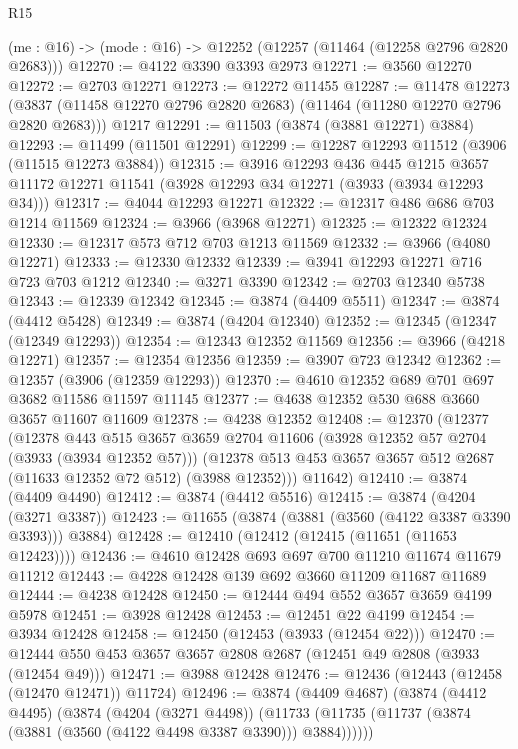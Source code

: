 \begin{lexlean}{R15}
\begin{coremodule}
  (me : @16) -> (mode : @16) -> @12252 (@12257 (@11464 (@12258 @2796 @2820 @2683)))
@12270 := @4122 @3390 @3393 @2973
@12271 := @3560 @12270
@12272 := @2703 @12271
@12273 := @12272 @11455
@12287 := @11478
    @12273
    (@3837 (@11458 @12270 @2796 @2820 @2683) (@11464 (@11280 @12270 @2796 @2820 @2683)))
    @1217
@12291 := @11503 (@3874 (@3881 @12271) @3884)
@12293 := @11499 (@11501 @12291)
@12299 := @12287 @12293 @11512 (@3906 (@11515 @12273 @3884))
@12315 := @3916
    @12293
    @436
    @445
    @1215
    @3657
    @11172
    @12271
    @11541
    (@3928 @12293 @34 @12271 (@3933 (@3934 @12293 @34)))
@12317 := @4044 @12293 @12271
@12322 := @12317 @486 @686 @703 @1214 @11569
@12324 := @3966 (@3968 @12271)
@12325 := @12322 @12324
@12330 := @12317 @573 @712 @703 @1213 @11569
@12332 := @3966 (@4080 @12271)
@12333 := @12330 @12332
@12339 := @3941 @12293 @12271 @716 @723 @703 @1212
@12340 := @3271 @3390
@12342 := @2703 @12340 @5738
@12343 := @12339 @12342
@12345 := @3874 (@4409 @5511)
@12347 := @3874 (@4412 @5428)
@12349 := @3874 (@4204 @12340)
@12352 := @12345 (@12347 (@12349 @12293))
@12354 := @12343 @12352 @11569
@12356 := @3966 (@4218 @12271)
@12357 := @12354 @12356
@12359 := @3907 @723 @12342
@12362 := @12357 (@3906 (@12359 @12293))
@12370 := @4610 @12352 @689 @701 @697 @3682 @11586 @11597 @11145
@12377 := @4638 @12352 @530 @688 @3660 @3657 @11607 @11609
@12378 := @4238 @12352
@12408 := @12370
    (@12377
      (@12378
        @443
        @515
        @3657
        @3659
        @2704
        @11606
        (@3928 @12352 @57 @2704 (@3933 (@3934 @12352 @57)))
        (@12378 @513 @453 @3657 @3657 @512 @2687 (@11633 @12352 @72 @512) (@3988 @12352)))
      @11642)
@12410 := @3874 (@4409 @4490)
@12412 := @3874 (@4412 @5516)
@12415 := @3874 (@4204 (@3271 @3387))
@12423 := @11655 (@3874 (@3881 (@3560 (@4122 @3387 @3390 @3393))) @3884)
@12428 := @12410 (@12412 (@12415 (@11651 (@11653 @12423))))
@12436 := @4610 @12428 @693 @697 @700 @11210 @11674 @11679 @11212
@12443 := @4228 @12428 @139 @692 @3660 @11209 @11687 @11689
@12444 := @4238 @12428
@12450 := @12444 @494 @552 @3657 @3659 @4199 @5978
@12451 := @3928 @12428
@12453 := @12451 @22 @4199
@12454 := @3934 @12428
@12458 := @12450 (@12453 (@3933 (@12454 @22)))
@12470 := @12444 @550 @453 @3657 @3657 @2808 @2687 (@12451 @49 @2808 (@3933 (@12454 @49)))
@12471 := @3988 @12428
@12476 := @12436 (@12443 (@12458 (@12470 @12471)) @11724)
@12496 := @3874
    (@4409 @4687)
    (@3874
      (@4412 @4495)
      (@3874
        (@4204 (@3271 @4498))
        (@11733 (@11735 (@11737 (@3874 (@3881 (@3560 (@4122 @4498 @3387 @3390))) @3884))))))

\end{coremodule}
\end{lexlean}
